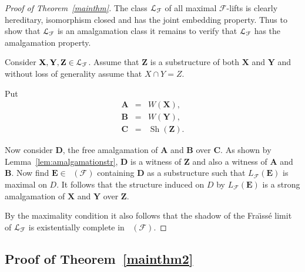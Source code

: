 \documentclass{elsarticle}
\def\Lifts{{\cal L}}
\def\Forb{\mathop{\mathrm{Forb_{he}}}\nolimits}
\def\sh{\mathop{\mathrm{Sh}}\nolimits}
\def\str#1{\mathbf {#1}}
\def\F{{\mathcal F}}
\def\Fraisse{Fra\"{\i}ss\' e}
\theoremstyle{plain}
\theoremstyle{definition}
\theoremstyle{remark}
\begin{document}
\begin{proof}[Proof of Theorem~\ref{mainthm}]
The class $\Lifts_\mathcal F$ of all maximal $\F$-lifts is clearly hereditary, isomorphism closed and has the joint
embedding property. 
Thus to show that $\Lifts_\mathcal F$ is an amalgamation class it remains to
verify that $\Lifts_\mathcal F$ has the amalgamation property.

Consider $\str{X},\str{Y},\str{Z}\in \Lifts_\mathcal F$. Assume that
$\str{Z}$ is a substructure of both $\str{X}$ and
$\str{Y}$ and without loss of generality assume that $X\cap Y=Z$.

Put
\begin{eqnarray*}
\str{A}&=&W(\str{X}),\\
\str{B}&=&W(\str{Y}),\\
\str{C}&=&\sh(\str{Z}).
\end{eqnarray*}

Now consider $\str{D}$, the free amalgamation of $\str{A}$ and $\str{B}$
over $\str{C}$.  As shown by Lemma~\ref{lem:amalgamationstr}, $\str{D}$ is a witness of
$\str{Z}$ and also a witness of $\str{A}$ and $\str{B}$.  Now find
$\str{E}\in \Forb(\F)$ containing $\str{D}$ as a substructure such that
$L_\F(\str{E})$ is maximal on $D$.
It follows that the structure induced on $D$ by $L_\F(\str{E})$ is a strong amalgamation of
$\str{X}$ and $\str{Y}$ over $\str{Z}$.

By the maximality condition it also follows that the shadow of the \Fraisse{} limit of $\Lifts_\F$
is existentially complete in $\Forb(\F)$.
\end{proof}

\subsection{Proof of Theorem~\ref{mainthm2}}
\label{sec:classification}
\end{document}
